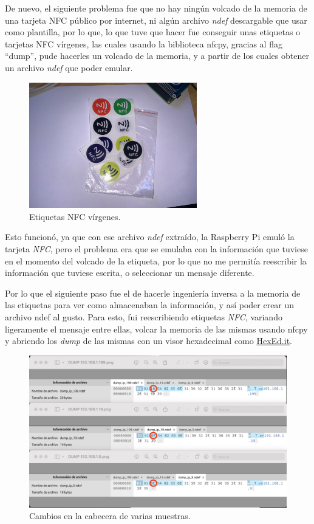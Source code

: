 De nuevo, el siguiente problema fue que no hay ningún volcado de la memoria de
una tarjeta NFC público por internet, ni algún archivo \emph{ndef} descargable
que usar como plantilla, por lo que, lo que tuve que hacer fue conseguir unas
etiquetas o tarjetas NFC vírgenes, las cuales usando la biblioteca nfcpy,
gracias al flag ``dump'', pude hacerles un volcado de la memoria, y a partir de
los cuales obtener un archivo \emph{ndef} que poder emular.\\

\begin{figure}[H]
    \centering
    \includegraphics[width=0.65\textwidth]{fotos/etiqueta_nfc.jpeg}
    \caption{Etiquetas NFC vírgenes.}
\end{figure}

Esto funcionó, ya que con ese archivo \emph{ndef} extraído, la Raspberry Pi
emuló la tarjeta \emph{NFC}, pero el problema era que se emulaba con la
información que tuviese en el momento del volcado de la etiqueta, por lo que no
me permitía reescribir la información que tuviese escrita, o seleccionar un
mensaje diferente.

Por lo que el siguiente paso fue el de hacerle ingeniería inversa a la memoria de
las etiquetas para ver como almacenaban la información, y así poder crear un
archivo ndef al gusto. Para esto, fui reescribiendo etiquetas \emph{NFC}, variando
ligeramente el mensaje entre ellas, volcar la memoria de las mismas usando nfcpy
y abriendo los \emph{dump} de las mismas con un visor hexadecimal como
\href{https://hexed.it/}{HexEd.it}.

\begin{figure}[H]
    \centering
    \includegraphics[width=\textwidth]{fotos/muestra_dumps.png}
    \caption{Cambios en la cabecera de varias muestras.}
\end{figure}

